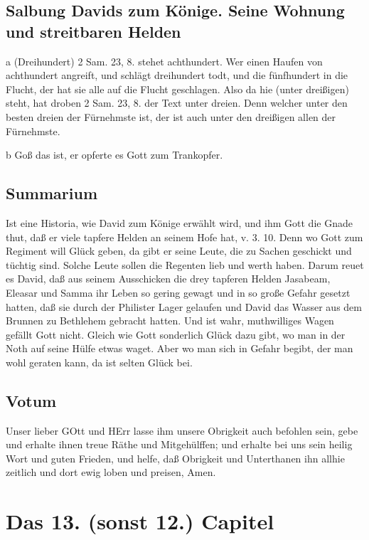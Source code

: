 \section[Salbung Davids zum Könige. Seine Wohnung und streitbaren]{Salbung Davids zum Könige. Seine Wohnung und streitbaren Helden}

a (Dreihundert) 2 Sam. 23, 8. stehet achthundert. Wer einen Haufen von achthundert angreift, und schlägt dreihundert todt, und die fünfhundert in die Flucht, der hat sie alle auf die Flucht geschlagen. Also da hie (unter dreißigen) steht, hat droben 2 Sam. 23, 8. der Text unter dreien. Denn welcher unter den besten dreien der Fürnehmste ist, der ist auch unter den dreißigen allen der Fürnehmste.

b Goß das ist, er opferte es Gott zum Trankopfer.

\section{Summarium}

Ist eine Historia, wie David zum Könige erwählt wird, und ihm Gott die Gnade thut, daß er viele tapfere Helden an seinem Hofe hat, v. 3. 10. Denn wo Gott zum Regiment will Glück geben, da gibt er seine Leute, die zu Sachen geschickt und tüchtig sind. Solche Leute sollen die Regenten lieb und werth haben. Darum reuet
es David, daß aus seinem Ausschicken die drey tapferen Helden Jasabeam, Eleasar und Samma ihr Leben so gering gewagt und in so große Gefahr gesetzt hatten, daß sie durch der Philister Lager gelaufen und David das Wasser aus dem Brunnen zu Bethlehem gebracht hatten. Und ist wahr, muthwilliges Wagen gefällt Gott nicht. Gleich wie Gott sonderlich Glück dazu gibt, wo man in der Noth auf seine Hülfe etwas waget. Aber wo man sich in Gefahr begibt, der man wohl geraten kann, da ist selten Glück bei.

\section{Votum}

Unser lieber GOtt und HErr lasse ihm unsere Obrigkeit auch befohlen sein, gebe und erhalte ihnen treue Räthe und Mitgehülffen; und erhalte bei uns sein heilig Wort und guten Frieden, und helfe, daß Obrigkeit und Unterthanen ihn allhie zeitlich und dort ewig loben und preisen, Amen.

\chapter{Das 13. (sonst 12.) Capitel}

